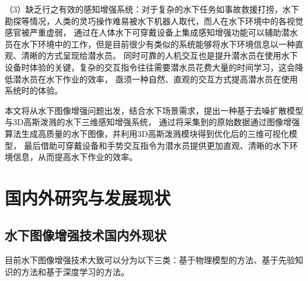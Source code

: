 （3）缺乏行之有效的感知增强系统：对于复杂的水下任务如事故救援打捞，水下勘探等情况，人类的灵巧操作难易被水下机器人取代，而人在水下环境中的各视觉感官被严重虚弱，
通过在人体水下可穿戴设备上集成感知增强功能可以辅助潜水员在水下环境中的工作，但是目前很少有类似的系统能够将水下环境信息以一种直观、清晰的方式呈现给潜水员。
同时可靠的人机交互也是提升潜水员在使用水下设备时体验的关键，复杂的交互指令往往需要潜水员花费大量的时间学习，这会降低潜水员在水下作业的效率，
亟须一种自然、直观的交互方式提高潜水员在使用系统时的体验。




本文将从水下图像增强问题出发，结合水下场景需求，提出一种基于去噪扩散模型与3D高斯泼溅的水下三维感知增强系统，
通过将采集到的原始数据通过图像增强算法生成高质量的水下图像，并利用3D高斯泼溅模块得到优化后的三维可视化模型，
最后借助可穿戴设备和手势交互指令为潜水员提供更加直观、清晰的水下环境信息，从而提高水下作业的效率。


\section{国内外研究与发展现状}
\subsection{水下图像增强技术国内外现状}
目前水下图像增强技术大致可以分为以下三类：基于物理模型的方法、基于先验知识的方法和基于深度学习的方法。
